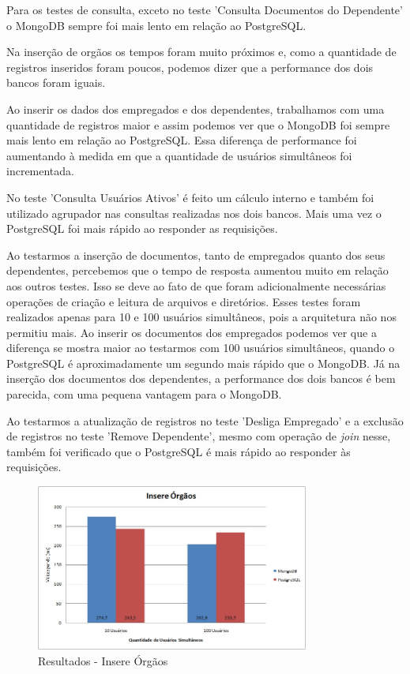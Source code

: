 Para os testes de consulta, exceto no teste 'Consulta Documentos do Dependente' o MongoDB sempre foi mais lento em relação ao PostgreSQL.

Na inserção de orgãos os tempos foram muito próximos e, como a quantidade de registros inseridos foram poucos, podemos dizer que a performance dos dois bancos foram iguais.

Ao inserir os dados dos empregados e dos dependentes, trabalhamos com uma quantidade de registros maior e assim podemos ver que o MongoDB foi sempre mais lento em relação ao PostgreSQL. Essa diferença de performance foi aumentando à medida em que a quantidade de usuários simultâneos foi incrementada.

No teste 'Consulta Usuários Ativos' é feito um cálculo interno e também foi utilizado agrupador nas consultas realizadas nos dois bancos. Mais uma vez o PostgreSQL foi mais rápido ao responder as requisições.

Ao testarmos a inserção de documentos, tanto de empregados quanto dos seus dependentes, percebemos que o tempo de resposta aumentou muito em relação aos outros testes. Isso se deve ao fato de que foram adicionalmente necessárias operações de criação e leitura de arquivos e diretórios. Esses testes foram realizados apenas para 10 e 100 usuários simultâneos, pois a arquitetura não nos permitiu mais. Ao inserir os documentos dos empregados podemos ver que a diferença se mostra maior ao testarmos com 100 usuários simultâneos, quando o PostgreSQL é aproximadamente um segundo mais rápido que o MongoDB. Já na inserção dos documentos dos dependentes, a performance dos dois bancos é bem parecida, com uma pequena vantagem para o MongoDB.

Ao testarmos a atualização de registros no teste 'Desliga Empregado' e a exclusão de registros no teste 'Remove Dependente', mesmo com operação de \textit{join} nesse, também foi verificado que o PostgreSQL é mais rápido ao responder às requisições.


\begin{figure}[!htbp]
	\begin{center}
		\includegraphics[width=0.8\textwidth]{resultados/insere_orgaos}
	\end{center}
	\caption{Resultados - Insere Órgãos}
	\label{fig:resultinsereorgaos}
\end{figure}

